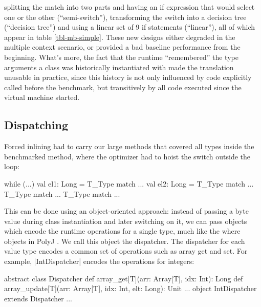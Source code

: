 splitting the match into two parts and having an if expression that would select one or the other (``semi-switch''), transforming the switch into a decision tree (``decision tree'') and using a linear set of 9 if statements (``linear''), all of which appear in table \ref{tbl-mb-simple}. These new designs either degraded in the multiple context scenario, or provided a bad baseline performance from the beginning. What's more, the fact that the runtime ``remembered'' the type arguments a class was historically instantiated with made the translation unusable in practice, since this history is not only influenced by code explicitly called before the benchmark, but transitively by all code executed since the virtual machine started. %

\subsection{Dispatching}
\label{subsec-mb-dispatching}

 Forced inlining had to carry our large methods that covered all types inside the benchmarked method, where the optimizer had to hoist the switch outside the loop:

\begin{lstlisting-nobreak}
 while (...) {
   val el1: Long = T_Type match { ... }
   val el2: Long = T_Type match { ... }
   T_Type match { ... }
   T_Type match { ... }
 }
\end{lstlisting-nobreak}

 This can be done using an object-oriented approach: instead of passing a byte value during class instantiation and later switching on it, we can pass objects which encode the runtime operations for a single type, much like the where objects in PolyJ \cite{myers-polyj}. We call this object the dispatcher. The dispatcher for each value type encodes a common set of operations such as array get and set. For example, |IntDispatcher| encodes the operations for integers:

\begin{lstlisting-nobreak}
 abstract class Dispatcher {
   def array_get[T](arr: Array[T], idx: Int): Long
   def array_update[T](arr: Array[T], idx: Int, elt: Long): Unit
   ...
 } 
 object IntDispatcher extends Dispatcher { ... }
\end{lstlisting-nobreak}

